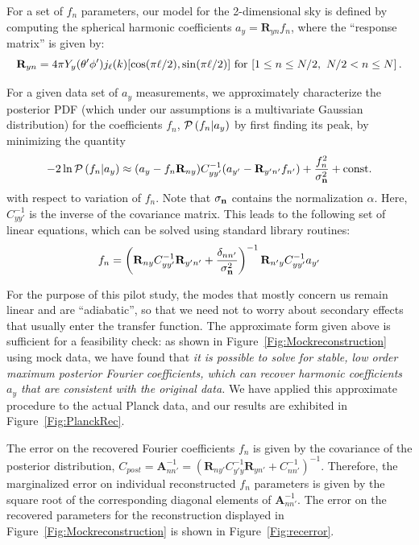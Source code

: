 \documentclass[psfig,12pt]{article}
\begin{document}
{For a set of $f_n$ parameters, our model for the 2-dimensional sky is defined by computing the spherical harmonic coefficients $a_y
=\mathbf{R}_{yn}f_n$, where the ``response
matrix'' is given by:
\begin{equation}
\mathbf{R}_{yn}=4\pi Y_y(\theta'\phi')j_\ell(k)[\cos(\pi\ell/2),\sin(\pi\ell/2)]\ {\rm for}\ [1\le n\le N/2,\ N/2<n\le N]\, .
\end{equation}

For a given data set of $a_y$ measurements, we approximately characterize the posterior PDF (which under our
assumptions is a multivariate Gaussian distribution) for the
coefficients $f_n$, ${\cal P}\left(f_n|a_y\right)$ by first finding its peak, by minimizing the quantity
\begin{equation}
-2\ln{\cal P}\left(f_n|a_y\right) \approx (a_y- f_n\mathbf{R}_{ny})C_{yy'}^{-1}(a_{y'}-\mathbf{R}_{y'n'}f_{n'})+\frac{f_n^2}{\sigma_{{\bf n}}^2} + \mathrm{const.}
\end{equation}
with respect to variation of $f_n$. Note that $\sigma_{\bf n}$ contains
the normalization $\alpha$.
Here, $C_{yy'}^{-1}$ is the inverse
of the covariance matrix. This leads to the following set of
linear equations, which can be solved using standard library routines:
\begin{equation}
f_n=\left(\mathbf{R}_{ny}C_{yy'}^{-1}\mathbf{R}_{y'n'}+\frac{\delta_{nn'}}{\sigma_{\bf n}^2}\right)^{-1}\mathbf{R}_{n'y}C_{yy'}^{-1}a_{y'}
\label{eq:mostprobablemodel}
\end{equation}


For the purpose of this pilot study, the modes that mostly concern us remain linear and are ``adiabatic'', so that we need not to worry about secondary effects that usually enter the transfer function. The approximate form given above is sufficient for a feasibility check:
as shown in Figure~\ref{Fig:Mockreconstruction} using mock data, we have found that {\it it is possible to solve for
stable, low order maximum posterior Fourier coefficients, which can
recover harmonic coefficients $a_y$ that are consistent with the
original data.} We have applied this approximate procedure to the
actual Planck data, and our results are exhibited in Figure~\ref{Fig:PlanckRec}.

The error on the recovered Fourier coefficients $f_n$ is given by the covariance of the posterior distribution,
$C_{post}=\mathbf{A}_{nn'}^{-1} = \left(\mathbf{R}_{ny'}C^{-1}_{y'y} \mathbf{R}_{yn'}+C_{nn'}^{-1}\right)^{-1}$.
Therefore, the marginalized error on individual reconstructed $f_n$ parameters is given by the square root of the corresponding diagonal elements of $\mathbf{A}_{nn'}^{-1} $. The error on the recovered parameters for the reconstruction displayed in Figure~\ref{Fig:Mockreconstruction} is shown in Figure~\ref{Fig:recerror}.



}
\end{document}
